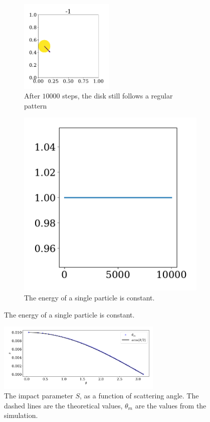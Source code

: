 \documentclass{article}
\begin{document}
\begin{figure}[H]
\begin{subfigure}{.35\textwidth}
            \includegraphics[width=0.49\textwidth]{../plots/test_case_one_particle/particle-1.pdf}
            \caption{After $10 000$ steps, the disk still follows a regular pattern}
            \label{single particle}
        \end{subfigure}
        \begin{subfigure}{.64\textwidth}
            \centering
            \includegraphics[width=.8\textwidth]{../plots/test_case_one_particle/energy.pdf}
            \caption{The energy of a single particle is constant.}
            \label{single particle energy}
        \end{subfigure}
    \end{figure}

    \begin{figure}[H]
        \centering
        \hspace{-10mm}
        \includegraphics[width=0.7\textwidth]{../plots/test_case_collision_angle/collision_angle.pdf}
        \caption{The impact parameter $S$, as a function of scattering angle. The dashed lines are the theoretical values, $\theta_m$ are the values from the simulation.}
        \label{scattering}
    \end{figure}
\end{document}
